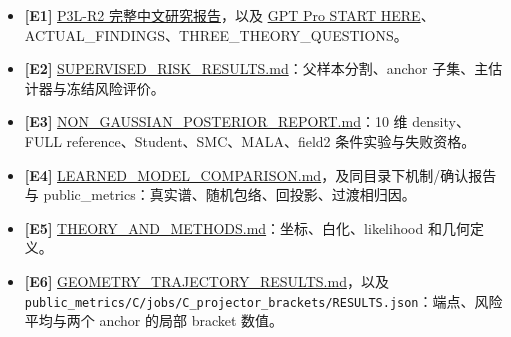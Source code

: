 \documentclass[
  11pt,
  a4paper,
]{article}
\providecommand{\tightlist}{%
  \setlength{\itemsep}{0pt}\setlength{\parskip}{0pt}}
\begin{document}
\begin{itemize}
\tightlist
\item
  \textbf{{[}E1{]}}
  \href{https://github.com/migodam/b1-probabilistic-maxwell-imaging/blob/6eadb4690c962aaa95821fc4056b677f0f924a6b/research/p3l_r2_risk_posterior_exploration/RESEARCH_REPORT_ZH.md}{P3L-R2
  完整中文研究报告}，以及
  \href{https://github.com/migodam/b1-probabilistic-maxwell-imaging/blob/6eadb4690c962aaa95821fc4056b677f0f924a6b/research/p3l_r2_risk_posterior_exploration/GPT_PRO_HANDOFF/START_HERE.md}{GPT
  Pro START HERE}、ACTUAL\_\allowbreak{}FINDINGS、THREE\_\allowbreak{}THEORY\_\allowbreak{}QUESTIONS。
\item
  \textbf{{[}E2{]}}
  \href{https://github.com/migodam/b1-probabilistic-maxwell-imaging/blob/6eadb4690c962aaa95821fc4056b677f0f924a6b/research/p3l_r2_risk_posterior_exploration/SUPERVISED_RISK_RESULTS.md}{SUPERVISED\_\allowbreak{}RISK\_\allowbreak{}RESULTS.md}：父样本分割、anchor
  子集、主估计器与冻结风险评价。
\item
  \textbf{{[}E3{]}}
  \href{https://github.com/migodam/b1-probabilistic-maxwell-imaging/blob/6eadb4690c962aaa95821fc4056b677f0f924a6b/research/p3l_r2_risk_posterior_exploration/NON_GAUSSIAN_POSTERIOR_REPORT.md}{NON\_\allowbreak{}GAUSSIAN\_\allowbreak{}POSTERIOR\_\allowbreak{}REPORT.md}：10
  维 density、FULL reference、Student、SMC、MALA、field2
  条件实验与失败资格。
\item
  \textbf{{[}E4{]}}
  \href{https://github.com/migodam/b1-probabilistic-maxwell-imaging/blob/6eadb4690c962aaa95821fc4056b677f0f924a6b/research/p3l_r2_risk_posterior_exploration/LEARNED_MODEL_COMPARISON.md}{LEARNED\_\allowbreak{}MODEL\_\allowbreak{}COMPARISON.md}，及同目录下机制/确认报告与
  public\_\allowbreak{}metrics：真实谱、随机包络、回投影、过渡相归因。
\item
  \textbf{{[}E5{]}}
  \href{https://github.com/migodam/b1-probabilistic-maxwell-imaging/blob/6eadb4690c962aaa95821fc4056b677f0f924a6b/research/p3l_r2_risk_posterior_exploration/THEORY_AND_METHODS.md}{THEORY\_\allowbreak{}AND\_\allowbreak{}METHODS.md}：坐标、白化、likelihood
  和几何定义。
\item
  \textbf{{[}E6{]}}
  \href{https://github.com/migodam/b1-probabilistic-maxwell-imaging/blob/6eadb4690c962aaa95821fc4056b677f0f924a6b/research/p3l_r2_risk_posterior_exploration/GEOMETRY_TRAJECTORY_RESULTS.md}{GEOMETRY\_\allowbreak{}TRAJECTORY\_\allowbreak{}RESULTS.md}，以及
  \nolinkurl{public_metrics/C/jobs/C_projector_brackets/RESULTS.json}：端点、风险平均与两个
  anchor 的局部 bracket 数值。

\end{itemize}
\end{document}
